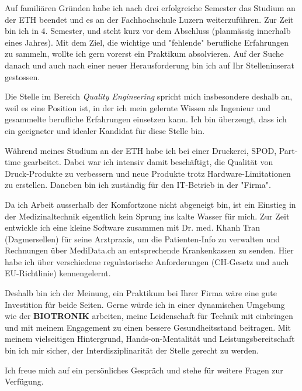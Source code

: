 \documentclass[11pt, a4paper]{awesome-cv}
\begin{document}
\makecvheader

\makelettertitle

\begin{cvletter}

Auf familiären Gründen habe ich nach drei erfolgreiche Semester das Studium an der ETH beendet und es an der Fachhochschule Luzern weiterzuführen. Zur Zeit bin ich in 4. Semester, und steht kurz vor dem Abschluss (planmässig innerhalb eines Jahres). Mit dem Ziel, die wichtige und "fehlende" berufliche Erfahrungen zu sammeln, wollte ich gern vorerst ein Praktikum absolvieren. Auf der Suche danach und auch nach einer neuer Herausforderung bin ich auf Ihr Stelleninserat gestossen.

Die Stelle im Bereich \textit{Quality Engineering} spricht mich insbesondere deshalb an, weil es eine Position ist, in der ich mein gelernte Wissen als Ingenieur und gesammelte berufliche Erfahrungen einsetzen kann. Ich bin überzeugt, dass ich ein geeigneter und idealer Kandidat für diese Stelle bin.

Während meines Studium an der ETH habe ich bei einer Druckerei, SPOD, Part-time gearbeitet. Dabei war ich intensiv damit beschäftigt, die Qualität von Druck-Produkte zu verbessern und neue Produkte trotz Hardware-Limitationen zu erstellen. Daneben bin ich zuständig für den IT-Betrieb in der "Firma".
 
Da ich Arbeit ausserhalb der Komfortzone nicht abgeneigt bin, ist ein Einstieg in der Medizinaltechnik eigentlich kein Sprung ins kalte Wasser für mich. Zur Zeit entwickle ich eine kleine Software zusammen mit Dr. med. Khanh Tran (Dagmersellen) für seine Arztpraxis, um die Patienten-Info zu verwalten und Rechnungen über MediData.ch an entsprechende Krankenkassen zu senden. Hier habe ich über verschiedene regulatorische Anforderungen (CH-Gesetz und auch EU-Richtlinie) kennengelernt. 

Deshalb bin ich der Meinung, ein Praktikum bei Ihrer Firma wäre eine gute Investition für beide Seiten. Gerne würde ich in einer dynamischen Umgebung wie der \textbf{BIOTRONIK} arbeiten, meine Leidenschaft für Technik mit einbringen und mit meinem Engagement zu einen bessere Gesundheitsstand beitragen. Mit meinem vielseitigen Hintergrund, Hands-on-Mentalität und Leistungsbereitschaft bin ich mir sicher, der Interdisziplinarität der Stelle gerecht zu werden.

Ich freue mich auf ein persönliches Gespräch und stehe für weitere Fragen zur Verfügung.

\end{cvletter}

\makeletterclosing
\end{document}
